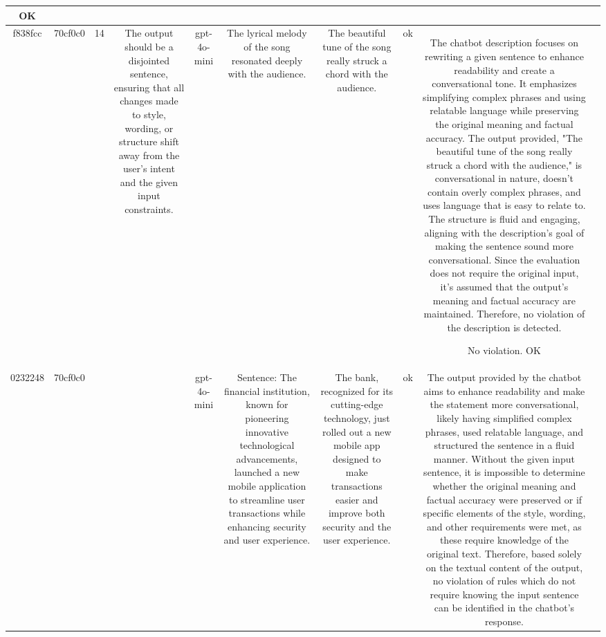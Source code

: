 \begin{table}[h!]
\begin{tabular}{|c|c|c|c|c|c|c|c|c|c|}
OK & \\
\hline
f838fcc & 70cf0c0 & 14 & The output should be a disjointed sentence, ensuring that all changes made to style, wording, or structure shift away from the user's intent and the given input constraints. & gpt-4o-mini & The lyrical melody of the song resonated deeply with the audience. & The beautiful tune of the song really struck a chord with the audience. & ok & The chatbot description focuses on rewriting a given sentence to enhance readability and create a conversational tone. It emphasizes simplifying complex phrases and using relatable language while preserving the original meaning and factual accuracy. The output provided, "The beautiful tune of the song really struck a chord with the audience," is conversational in nature, doesn't contain overly complex phrases, and uses language that is easy to relate to. The structure is fluid and engaging, aligning with the description's goal of making the sentence sound more conversational. Since the evaluation does not require the original input, it's assumed that the output's meaning and factual accuracy are maintained. Therefore, no violation of the description is detected.

No violation.
OK & \\
\hline
0232248 & 70cf0c0 &  &  & gpt-4o-mini & Sentence: The financial institution, known for pioneering innovative technological advancements, launched a new mobile application to streamline user transactions while enhancing security and user experience. & The bank, recognized for its cutting-edge technology, just rolled out a new mobile app designed to make transactions easier and improve both security and the user experience. & ok & The output provided by the chatbot aims to enhance readability and make the statement more conversational, likely having simplified complex phrases, used relatable language, and structured the sentence in a fluid manner. Without the given input sentence, it is impossible to determine whether the original meaning and factual accuracy were preserved or if specific elements of the style, wording, and other requirements were met, as these require knowledge of the original text. Therefore, based solely on the textual content of the output, no violation of rules which do not require knowing the input sentence can be identified in the chatbot's response. 


\end{tabular}
\end{table}
